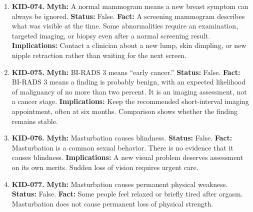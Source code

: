 \documentclass[11pt,oneside]{book}
\begin{document}
\begin{enumerate}[leftmargin=0pt,labelwidth=0pt,labelsep=0pt,itemindent=0pt]
\textbf{Status:} False.\newline
\textbf{Fact:} Mammography can detect many cancers before symptoms appear, but some cancers are missed. Dense breast tissue can make a tumor harder to see. \cite{ref312}\newline
\textbf{Implications:} Attend recommended screening and report new breast changes between appointments.
\item[] \textbf{KID-074.} \textbf{Myth:} A normal mammogram means a new breast symptom can always be ignored.\newline
\textbf{Status:} False.\newline
\textbf{Fact:} A screening mammogram describes what was visible at the time. Some abnormalities require an examination, targeted imaging, or biopsy even after a normal screening result. \cite{ref312,ref363}\newline
\textbf{Implications:} Contact a clinician about a new lump, skin dimpling, or new nipple retraction rather than waiting for the next screen.
\item[] \textbf{KID-075.} \textbf{Myth:} BI-RADS 3 means ``early cancer.''\newline
\textbf{Status:} False.\newline
\textbf{Fact:} BI-RADS 3 means a finding is probably benign, with an expected likelihood of malignancy of no more than two percent. It is an imaging assessment, not a cancer stage. \cite{ref274,ref366}\newline
\textbf{Implications:} Keep the recommended short-interval imaging appointment, often at six months. Comparison shows whether the finding remains stable.
\item[] \textbf{KID-076.} \textbf{Myth:} Masturbation causes blindness.\newline
\textbf{Status:} False.\newline
\textbf{Fact:} Masturbation is a common sexual behavior. There is no evidence that it causes blindness. \cite{ref367}\newline
\textbf{Implications:} A new visual problem deserves assessment on its own merits. Sudden loss of vision requires urgent care.
\item[] \textbf{KID-077.} \textbf{Myth:} Masturbation causes permanent physical weakness.\newline
\textbf{Status:} False.\newline
\textbf{Fact:} Some people feel relaxed or briefly tired after orgasm. Masturbation does not cause permanent loss of physical strength. \cite{ref367}\newline

\end{enumerate}
\end{document}
